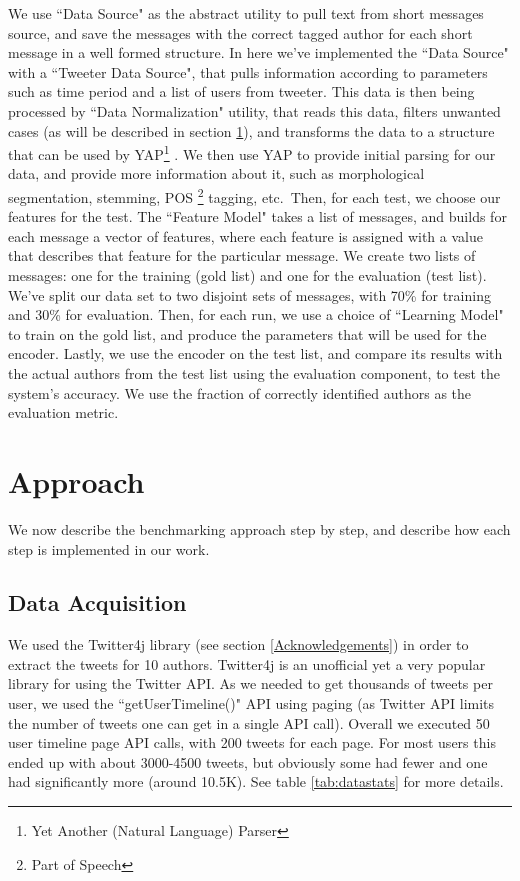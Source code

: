 \documentclass[a4paper]{article}
\begin{document}
We use ``Data Source" as the abstract utility to pull text from short messages source, and save the messages with the correct tagged author for each short message in a well formed structure.
In here we've implemented the ``Data Source" with a ``Tweeter Data Source", that pulls information according to parameters such as time period and a list of users from tweeter.
This data is then being processed by ``Data Normalization" utility, that reads this data, filters unwanted cases (as will be described in section \ref{Approach}), and transforms the data to a structure that can be used by YAP\footnote{Yet Another (Natural Language) Parser} \cite{moretsarfatycoling2016}.
We then use YAP to provide initial parsing for our data, and provide more information about it, such as morphological segmentation, stemming, POS \footnote{Part of Speech} tagging, etc.\
Then, for each test, we choose our features for the test. The ``Feature Model" takes a list of messages, and builds for each message a vector of features, where each feature is assigned with a value that describes that feature for the particular message.
We create two lists of messages: one for the training (gold list) and one for the evaluation (test list). We've split our data set to two disjoint sets of messages, with 70\% for training and 30\% for evaluation.
Then, for each run, we use a choice of ``Learning Model" to train on the gold list, and produce the parameters that will be used for the encoder.
Lastly, we use the encoder on the test list, and compare its results with the actual authors from the test list using the evaluation component, to test the system's accuracy.
We use the fraction of correctly identified authors as the evaluation metric.

\section{Approach}
\label{Approach}

We now describe the benchmarking approach step by step, and describe how each step is implemented in our work.
\subsection{Data Acquisition}

We used the Twitter4j library (see section \ref{Acknowledgements}) in order to extract the tweets for 10 authors. Twitter4j is an unofficial yet a very popular library for using the Twitter API. As we needed to get thousands of tweets per user, we used the ``getUserTimeline()" API using paging (as Twitter API limits the number of tweets one can get in a single API call). Overall we executed 50 user timeline page API calls, with 200 tweets for each page. For most users this ended up with about 3000-4500 tweets, but obviously some had fewer and one had significantly more (around 10.5K). See table \ref{tab:datastats} for more details.
\end{document}
